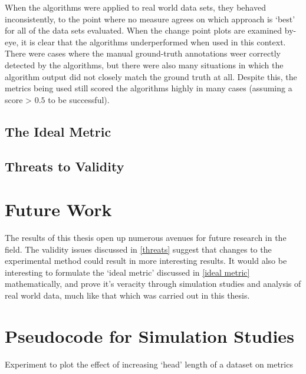 \documentclass{uvamscse}	%
\begin{document}
When the algorithms were applied to real world data sets, they behaved inconsistently, to the point where no measure agrees on which approach is `best' for all of the data sets evaluated. When the change point plots are examined by-eye, it is clear that the algorithms underperformed when used in this context. There were cases where the manual ground-truth annotations weer correctly detected by the algorithms, but there were also many situations in which the algorithm output did not closely match the ground truth at all. Despite this, the metrics being used still scored the algorithms highly in many cases (assuming a score > $0.5$ to be successful).

\section{The Ideal Metric}
\label{ideal metric}

\section{Threats to Validity}
\label{threats}


\chapter{Future Work}

The results of this thesis open up numerous avenues for future research in the field. The validity issues discussed in \autoref{threats} suggest that changes to the experimental method could result in more interesting results.
It would also be interesting to formulate the `ideal metric' discussed in \autoref{ideal metric} mathematically, and prove it's veracity through simulation studies and analysis of real world data, much like that which was carried out in this thesis.


\printbibliography

\appendix
{}

\chapter{Pseudocode for Simulation Studies}

\begin{algorithm}[h]
\caption{Experiment to plot the effect of increasing `head' length of a dataset on metrics}
\end{algorithm}
\end{document}
